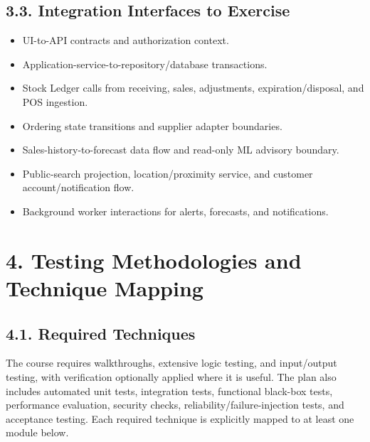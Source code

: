 \subsection{3.3. Integration Interfaces to Exercise}\label{integration-interfaces-to-exercise}

\begin{itemize}
\item
  UI-to-API contracts and authorization context.
\item
  Application-service-to-repository/database transactions.
\item
  Stock Ledger calls from receiving, sales, adjustments, expiration/disposal, and POS ingestion.
\item
  Ordering state transitions and supplier adapter boundaries.
\item
  Sales-history-to-forecast data flow and read-only ML advisory boundary.
\item
  Public-search projection, location/proximity service, and customer account/notification flow.
\item
  Background worker interactions for alerts, forecasts, and notifications.
\end{itemize}

\clearpage
\section{4. Testing Methodologies and Technique Mapping}\label{testing-methodologies-and-technique-mapping}

\subsection{4.1. Required Techniques}\label{required-techniques}

The course requires walkthroughs, extensive logic testing, and input/output testing, with verification optionally applied where it is useful. The plan also includes automated unit tests, integration tests, functional black-box tests, performance evaluation, security checks, reliability/failure-injection tests, and acceptance testing. Each required technique is explicitly mapped to at least one module below.


